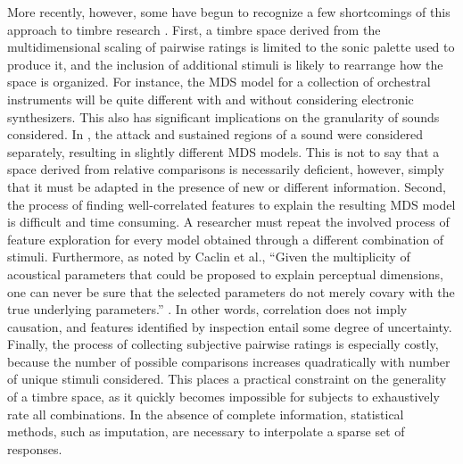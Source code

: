 More recently, however, some have begun to recognize a few shortcomings of this approach to timbre research \cite{Glennon2014}.
First, a timbre space derived from the multidimensional scaling of pairwise ratings is limited to the sonic palette used to produce it, and the inclusion of additional stimuli is likely to rearrange how the space is organized.
For instance, the MDS model for a collection of orchestral instruments will be quite different with and without considering electronic synthesizers.
This also has significant implications on the granularity of sounds considered.
In \cite{Krumhansl1980?}, the attack and sustained regions of a sound were considered separately, resulting in slightly different MDS models.
This is not to say that a space derived from relative comparisons is necessarily deficient, however, simply that it must be adapted in the presence of new or different information.
Second, the process of finding well-correlated features to explain the resulting MDS model is difficult and time consuming.
A researcher must repeat the involved process of feature exploration for every model obtained through a different combination of stimuli.
Furthermore, as noted by Caclin et al., ``Given the multiplicity of acoustical parameters that could be proposed to explain perceptual dimensions, one can never be sure that the selected parameters do not merely covary with the true underlying parameters.'' \cite{Caclin2005}.
In other words, correlation does not imply causation, and features identified by inspection entail some degree of uncertainty.
Finally, the process of collecting subjective pairwise ratings is especially costly, because the number of possible comparisons increases quadratically with number of unique stimuli considered.
This places a practical constraint on the generality of a timbre space, as it quickly becomes impossible for subjects to exhaustively rate all combinations.
In the absence of complete information, statistical methods, such as imputation, are necessary to interpolate a sparse set of responses.



